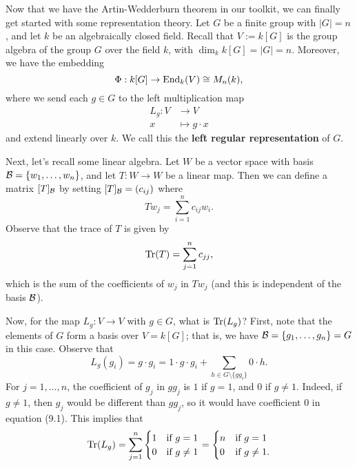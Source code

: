 Now that we have the Artin-Wedderburn theorem in our toolkit, we can finally get started with 
some representation theory. Let $G$ be a finite group with $|G| = n$, and let $k$ 
be an algebraically closed field. Recall that $V := k[G]$ is the group algebra of the group $G$ over 
the field $k$, with $\dim_k k[G] = |G| = n$. Moreover, we have the embedding 
\[ \Phi : k[G] \to \operatorname{End}_k(V) \cong M_n(k), \]
where we send each $g \in G$ to the left multiplication map 
\begin{align*}
    L_g : V &\to V \\ x &\mapsto g \cdot x
\end{align*}
and extend linearly over $k$. We call this the {\bf left regular representation} of $G$. 

Next, let's recall some linear algebra. Let $W$ be a vector space with basis ${\cal B} 
= \{w_1, \dots, w_n\}$, and let $T : W \to W$ be a linear map. Then we can define a matrix 
$[T]_{\cal B}$ by setting $[T]_{\cal B} = (c_{ij})$ where 
\[ Tw_j = \sum_{i=1}^n c_{ij} w_i. \] 
Observe that the trace of $T$ is given by 
\[ \operatorname{Tr}(T) = \sum_{j=1}^n c_{jj}, \]
which is the sum of the coefficients of $w_j$ in $Tw_j$ (and this is independent of the basis 
${\cal B}$). 

Now, for the map $L_g : V \to V$ with $g \in G$, what is $\operatorname{Tr}(L_g)$? First, note that the elements of 
$G$ form a basis over $V = k[G]$; that is, we have ${\cal B} = \{g_1, \dots, g_n\} = G$ in this case. 
Observe that 
\begin{equation} L_g(g_i) = g \cdot g_i = 1 \cdot g \cdot g_i + \sum_{h \in G \setminus \{gg_i\}} 0 \cdot h. \end{equation}
For $j = 1, \dots, n$, the coefficient of $g_j$ in $gg_j$ is $1$ if $g = 1$, and $0$ if 
$g \neq 1$. Indeed, if $g \neq 1$, then $g_j$ would be different than $gg_j$, so it would have 
coefficient $0$ in equation (9.1). This implies that 
\[ \operatorname{Tr}(L_g) = \sum_{j=1}^n \begin{cases} 1 & \text{if } g = 1 \\ 0 & \text{if } g \neq 1 \end{cases} 
= \begin{cases} n & \text{if } g = 1 \\ 0 & \text{if } g \neq 1. \end{cases} \]

